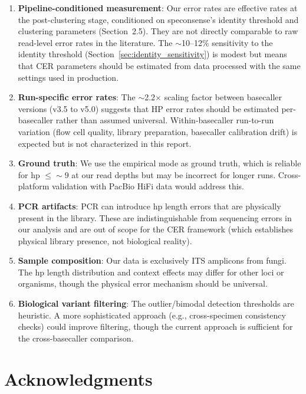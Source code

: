 \documentclass[11pt]{article}
\begin{document}
\begin{enumerate}
\item \textbf{Pipeline-conditioned measurement}: Our error rates are effective
  rates at the post-clustering stage, conditioned on speconsense's identity
  threshold and clustering parameters (Section~2.5). They are not directly
  comparable to raw read-level error rates in the literature. The
  ${\sim}$10--12\% sensitivity to the identity threshold
  (Section~\ref{sec:identity_sensitivity}) is modest but means that CER
  parameters should be estimated from data processed with the same settings
  used in production.

\item \textbf{Run-specific error rates}: The ${\sim}$2.2$\times$ scaling
  factor between basecaller versions (v3.5 to v5.0) suggests that HP error
  rates should be estimated per-basecaller rather than assumed universal.
  Within-basecaller run-to-run variation (flow cell quality, library
  preparation, basecaller calibration drift) is expected but is not
  characterized in this report.

\item \textbf{Ground truth}: We use the empirical mode as ground truth, which
  is reliable for hp $\leq {\sim}9$ at our read depths but may be incorrect for
  longer runs. Cross-platform validation with PacBio HiFi data would address
  this.

\item \textbf{PCR artifacts}: PCR can introduce hp length errors that are
  physically present in the library. These are indistinguishable from sequencing
  errors in our analysis and are out of scope for the CER framework (which
  establishes physical library presence, not biological reality).

\item \textbf{Sample composition}: Our data is exclusively ITS amplicons from
  fungi. The hp length distribution and context effects may differ for other
  loci or organisms, though the physical error mechanism should be universal.

\item \textbf{Biological variant filtering}: The outlier/bimodal detection
  thresholds are heuristic. A more sophisticated approach (e.g., cross-specimen
  consistency checks) could improve filtering, though the current approach is
  sufficient for the cross-basecaller comparison.
\end{enumerate}


\section*{Acknowledgments}
\end{document}
